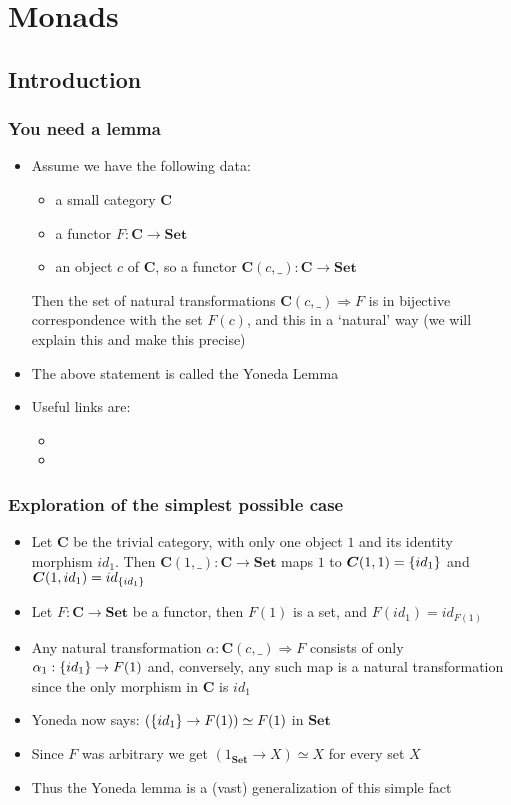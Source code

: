 \documentclass[handout]{beamer}
\title[INF223 presentations]{}
\newcommand{\To}{\Rightarrow}
\newcommand{\bfsf}[1]{{\boldsymbol{#1}}}
\newcommand{\Set}{\bfsf{Set}}
\newcommand{\CC}{\bfsf{C}}
\begin{document}
\section{Monads}
\subsection{Introduction}
 
\frame
  {   
    \frametitle{You need a lemma}\label{Yon:Intro}

 \begin{itemize}[<+->]
\item Assume we have the following data:
\begin{itemize}
    \item a small category $\CC$
    \item a functor $F:\CC\to\Set$
    \item an object $c$ of $\CC$, so a functor $\CC(c,\_):\CC\to\Set$
 \end{itemize}
Then the set of natural transformations $\CC(c,\_)\To F$ is in bijective
correspondence with the set $F(c)$, and this in a `natural' way
(we will explain this and make this precise)
\item The above statement is called the Yoneda Lemma
\item Useful links are:
 \begin{itemize}
    \item {}
    \item {}
 \end{itemize}
 \end{itemize}

 }

\frame
  {   
    \frametitle{Exploration of the simplest possible case}\label{Yon:Triv}

 \begin{itemize}[<+->]
\item Let $\CC$ be the trivial category, with only one object $1$ and
 its identity morphism $id_1$. Then $\CC(1,\_):\CC\to\Set$ maps
$1$ to $\CC(1,1) = \set{id_1}$ and $\CC(1,id_1) = id_{\set{id_1}}$
\item Let $F:\CC\to\Set$ be a functor, then $F(1)$ is a set, and
$F(id_1) = id_{F(1)}$
\item Any natural transformation $\alpha: \CC(c,\_)\To F$ consists of
only $\alpha_1: \{id_1\} \to F(1)$ and,
conversely, any such map is a natural transformation
since the only morphism in $\CC$ is $id_1$
\item Yoneda now says:  $(\{id_1\} \to F(1)) \simeq F(1)$ in $\Set$
\item Since $F$ was arbitrary we get  $(1_\Set \to X) \simeq X$ for every set $X$
\item Thus the Yoneda lemma is a (vast) generalization of this simple fact
 \end{itemize}

 }
\end{document}

